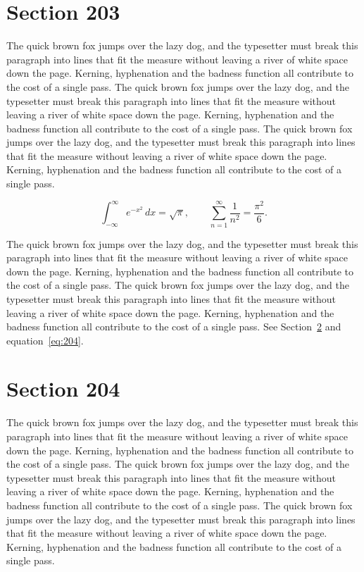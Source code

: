 \documentclass{article}
\begin{document}
\section{Section 203}
\label{sec:203}
The quick brown fox jumps over the lazy dog, and the typesetter must break this paragraph into lines that fit the measure without leaving a river of white space down the page. Kerning, hyphenation and the badness function all contribute to the cost of a single pass. The quick brown fox jumps over the lazy dog, and the typesetter must break this paragraph into lines that fit the measure without leaving a river of white space down the page. Kerning, hyphenation and the badness function all contribute to the cost of a single pass. The quick brown fox jumps over the lazy dog, and the typesetter must break this paragraph into lines that fit the measure without leaving a river of white space down the page. Kerning, hyphenation and the badness function all contribute to the cost of a single pass. 

\begin{equation}\label{eq:203}
\int_{-\infty}^{\infty} e^{-x^{2}}\,dx = \sqrt{\pi}, \qquad
\sum_{n=1}^{\infty} \frac{1}{n^{2}} = \frac{\pi^{2}}{6}.
\end{equation}

The quick brown fox jumps over the lazy dog, and the typesetter must break this paragraph into lines that fit the measure without leaving a river of white space down the page. Kerning, hyphenation and the badness function all contribute to the cost of a single pass. The quick brown fox jumps over the lazy dog, and the typesetter must break this paragraph into lines that fit the measure without leaving a river of white space down the page. Kerning, hyphenation and the badness function all contribute to the cost of a single pass. 
See Section~\ref{sec:204} and equation~\eqref{eq:204}.
\section{Section 204}
\label{sec:204}
The quick brown fox jumps over the lazy dog, and the typesetter must break this paragraph into lines that fit the measure without leaving a river of white space down the page. Kerning, hyphenation and the badness function all contribute to the cost of a single pass. The quick brown fox jumps over the lazy dog, and the typesetter must break this paragraph into lines that fit the measure without leaving a river of white space down the page. Kerning, hyphenation and the badness function all contribute to the cost of a single pass. The quick brown fox jumps over the lazy dog, and the typesetter must break this paragraph into lines that fit the measure without leaving a river of white space down the page. Kerning, hyphenation and the badness function all contribute to the cost of a single pass. 
\end{document}
